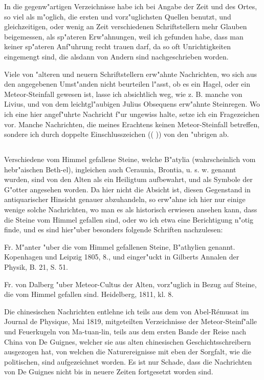 \documentclass[a4paper, 11pt, oneside, polutonikogreek, german]{article}
\begin{document}
In die gegenw"artigen Verzeichnisse habe ich bei Angabe der Zeit und des Ortes, so viel als m"oglich, die ersten und vorz"uglichsten Quellen benutzt, und gleichzeitigen, oder wenig an Zeit verschiedenen Schriftstellern mehr Glauben beigemessen, als sp"ateren Erw"ahnungen, weil ich gefunden habe, dass man keiner sp"ateren Anf"uhrung recht trauen darf, da so oft Unrichtigkeiten eingemengt sind, die alsdann von Andern sind nachgeschrieben worden.

Viele von "alteren und neuern Schriftstellern erw"ahnte Nachrichten, wo sich aus den angegebenen Umst"anden nicht beurteilen l"asst, ob es ein Hagel, oder ein Meteor-Steinfall gewesen ist, lasse ich absichtlich weg, wie z. B. manche von Livius, und von dem leichtgl"aubigen Julius Obsequens erw"ahnte Steinregen. Wo ich eine hier angef"uhrte Nachricht f"ur ungewiss halte, setze ich ein Fragezeichen vor. Manche Nachrichten, die meines Erachtens keinen Meteor-Steinfall betreffen, sondere ich durch doppelte Einschlusszeichen (( )) von den "ubrigen ab.
\subsection{}
\paragraph{}
Verschiedene vom Himmel gefallene Steine, welche B"atylia (wahrscheinlich vom hebr"aischen Beth-el), ingleichen auch Ceraunia, Brontia, u. s. w. genannt wurden, sind von den Alten als ein Heiligtum aufbewahrt, und als Symbole der G"otter angesehen worden. Da hier nicht die Absicht ist, diesen Gegenstand in antiquarischer Hinsicht genauer abzuhandeln, so erw"ahne ich hier nur einige wenige solche Nachrichten, wo man es als historisch erwiesen ansehen kann, dass die Steine vom Himmel gefallen sind, oder wo ich etwa eine Berichtigung n"otig finde, und es sind hier"uber besonders folgende Schriften nachzulesen:

Fr. M"anter "uber die vom Himmel gefallenen Steine, B"athylien genannt. Kopenhagen und Leipzig 1805, 8., und einger"uckt in Gilberts Annalen der Physik, B. 21, S. 51.

Fr. von Dalberg "uber Meteor-Cultus der Alten, vorz"uglich in Bezug auf Steine, die vom Himmel gefallen sind. Heidelberg, 1811, kl. 8.

Die chinesischen Nachrichten entlehne ich teils aus dem von Abel-Rémusat im Journal de Physique, Mai 1819, mitgeteilten Verzeichnisse der Meteor-Steinf"alle und Feuerkugeln von Ma-tuan-lin, teils aus dem ersten Bande der Reise nach China von De Guignes, welcher sie aus alten chinesischen Geschichtsschreibern ausgezogen hat, von welchen die Naturereignisse mit eben der Sorgfalt, wie die politischen, sind aufgezeichnet worden. Es ist nur Schade, dass die Nachrichten von De Guignes nicht bis in neuere Zeiten fortgesetzt worden sind.
\end{document}
